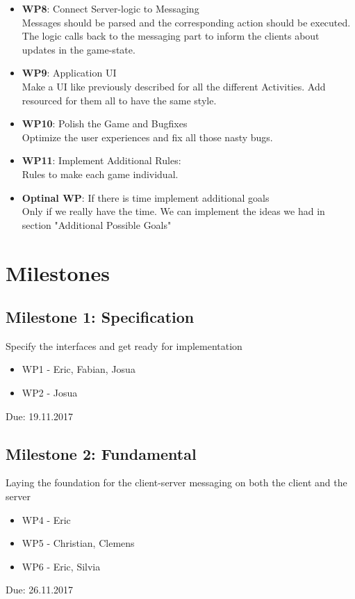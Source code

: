 \documentclass{sig-alternate}
\begin{document}
\begin{itemize}
		\item {\bf WP8}: Connect Server-logic to Messaging\\
		Messages should be parsed and the corresponding action should be executed. The logic calls back to the messaging part to inform the clients about updates in the game-state. 
		
		\item {\bf WP9}: Application UI\\
		Make a UI like previously described for all the different Activities. Add resourced for them all to have the same style.
		
		\item {\bf WP10}: Polish the Game and Bugfixes\\
		Optimize the user experiences and fix all those nasty bugs.
		
		\item {\bf WP11}: Implement Additional Rules:\\
		Rules to make each game individual.
		
		\item {\bf Optinal WP}: If there is time implement additional goals\\
        Only if we really have the time. We can implement the ideas we had in section "Additional Possible Goals"
        
\end{itemize}

\section{Milestones}

\subsection{Milestone 1: Specification}
Specify the interfaces and get ready for implementation
\begin{itemize}
	\item WP1 - Eric, Fabian, Josua
	\item WP2 - Josua
\end{itemize}
Due: 19.11.2017

\subsection{Milestone 2: Fundamental}
Laying the foundation for the client-server messaging on both the client and the server
\begin{itemize}
	\item WP4 - Eric
	\item WP5 - Christian, Clemens
	\item WP6 - Eric, Silvia
\end{itemize}
Due: 26.11.2017
	
\end{document}
